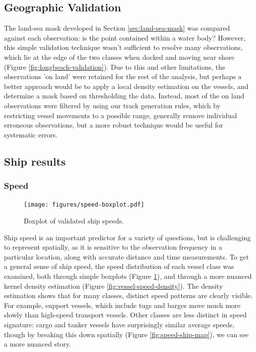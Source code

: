 \documentclass[12pt,letterpaper]{article}
\begin{document}
\subsection{Geographic Validation}

The land-sea mask developed in Section \ref{sec:land-sea-mask}  was compared against each observation: is the point contained within a water body? However, this simple validation technique wasn't sufficient to resolve many observations, which lie at the edge of the two classes when docked and moving near shore (Figure \ref{fig:longbeach-validation}). Due to this and other limitations, the observations 'on land' were retained for the rest of the analysis, but perhaps a better approach would be to apply a local density estimation on the vessels, and determine a mask based on thresholding the data. Instead, most of the on land observations were filtered by using our track generation rules, which by restricting vessel movements to a possible range, generally remove individual erroneous observations, but a more robust technique would be useful for systematic errors.


\subsection{Ship results}

\subsubsection{Speed}
\begin{figure}[htbp]
  \centering
  \texttt{[image: figures/speed-boxplot.pdf]}
  \caption{Boxplot of validated ship speeds.}
  \label{fig:vessel-speed-boxplot}
\end{figure}

Ship speed is an important predictor for a variety of questions, but is challenging to represent spatially, as it is sensitive to the observation frequency in a particular location, along with accurate distance and time measurements. To get a general sense of ship speed, the speed distribution of each vessel class was examined, both through simple boxplots (Figure \ref{fig:vessel-speed-boxplot}), and through a more nuanced kernel density estimation (Figure \ref{fig:vessel-speed-density}). The density estimation shows that for many classes, distinct speed patterns are clearly visible. For example, support vessels, which include tugs and barges move much more slowly than high-speed transport vessels. Other classes are less distinct in speed signature: cargo and tanker vessels have surprisingly similar average speeds, though by breaking this down spatially (Figure \ref{fig:speed-ship-map}), we can see a more nuanced story.
\end{document}

